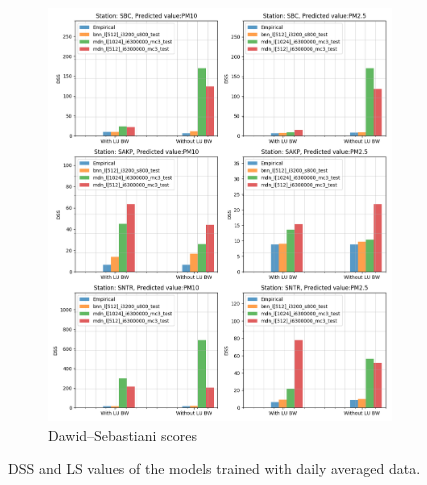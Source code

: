 \documentclass[12pt,a4paper,twoside]{scrartcl}
\numberwithin{equation}{section}
\newcounter{mypagecount}%
\newenvironment{interlude}{%
  \clearpage
  \setcounter{mypagecount}{\value{page}}%
  \thispagestyle{empty}%
  \pagestyle{empty}%
}{%
  \clearpage
  \setcounter{page}{\value{mypagecount}}%
}
\begin{document}
\begin{interlude}
\begin{appendices}
\begin{figure}[h!]
\begin{subfigure}[t]{0.49\textwidth}
        \includegraphics[width=\textwidth,height=1.2\textwidth]{figures/figs_1d/results_plot_DSS}%
        \caption{Dawid–Sebastiani scores}
      \end{subfigure}
      \caption[DSS and LS of the models (daily averaged data)]{DSS and LS values of the models trained with daily averaged data.}
    \end{figure}
    \begin{figure}[h!]
      \centering
      \begin{subfigure}[t]{0.49\textwidth}

\end{subfigure}
\end{figure}
\end{appendices}
\end{interlude}
\end{document}
